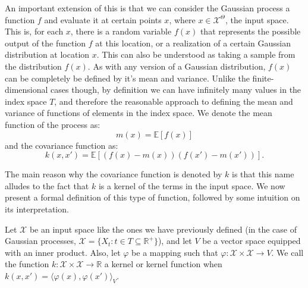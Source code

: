 An important extension of this is that we can consider the Gaussian process a function $f$ and evaluate it at certain points $x$, where $x \in \mathcal{X}^\Theta$, the input space. This is, for each $x$, there is a random variable $f(x)$ that represents the possible output of the function $f$ at this location, or a realization of a certain Gaussian distribution at location $x$. This can also be understood as taking a sample from the distribution $f(x)$. As with any version of a Gaussian distribution, $f(x)$ can be completely be defined by it's mean and variance. Unlike the finite-dimensional cases though, by definition we can have infinitely many values in the index space $T$, and therefore the reasonable approach to defining the mean and variance of functions of elements in the index space. We denote the mean function of the process as: 
\[ m(x) = \mathbb{E}[f(x)] \]
and the covariance function as: 
\[ k(x, x') = \mathbb{E}[(f(x) - m(x))(f(x') - m(x'))]. \]

The main reason why the covariance function is denoted by $k$ is that this name alludes to the fact that $k$ is a kernel of the terms in the input space. We now present a formal definition of this type of function, followed by some intuition on its interpretation. 

\begin{definition}
	Let $\mathcal{X}$ be an input space like the ones we have previously defined (in the case of Gaussian processes, $\mathcal{X} = \{ X_t : t \in T \subseteq \mathbb{R}^+ \}$), and let $V$ be a vector space equipped with an inner product. Also, let $\varphi$ be a mapping such that $\varphi: \mathcal{X} \times \mathcal{X} \rightarrow V$. We call the function $k: \mathcal{X} \times \mathcal{X} \rightarrow \mathbb{R}$ a kernel or kernel function when $k(x, x') = \langle \varphi (x), \varphi (x') \rangle_V$. 
\end{definition}








